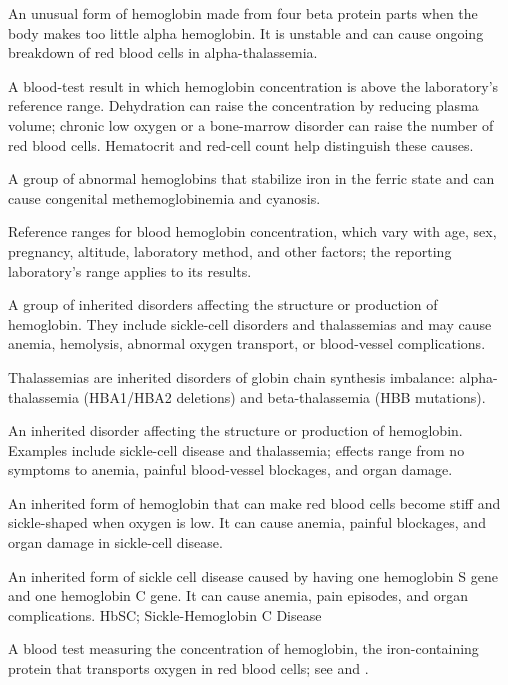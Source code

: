  An unusual form of hemoglobin made from four beta protein parts when the body makes too little alpha hemoglobin. It is unstable and can cause ongoing breakdown of red blood cells in alpha-thalassemia.

 A blood-test result in which hemoglobin concentration is above the laboratory's reference range. Dehydration can raise the concentration by reducing plasma volume; chronic low oxygen or a bone-marrow disorder can raise the number of red blood cells. Hematocrit and red-cell count help distinguish these causes.

 A group of abnormal hemoglobins that stabilize iron in the ferric state and can cause congenital methemoglobinemia and cyanosis.

 Reference ranges for blood hemoglobin concentration, which vary with age, sex, pregnancy, altitude, laboratory method, and other factors; the reporting laboratory's range applies to its results.

 A group of inherited disorders affecting the structure or production of hemoglobin. They include sickle-cell disorders and thalassemias and may cause anemia, hemolysis, abnormal oxygen transport, or blood-vessel complications.

 Thalassemias are inherited disorders of globin chain synthesis imbalance:
alpha-thalassemia (HBA1/HBA2 deletions) and beta-thalassemia (HBB mutations).

 An inherited disorder affecting the structure or production of hemoglobin. Examples include sickle-cell disease and thalassemia; effects range from no symptoms to anemia, painful blood-vessel blockages, and organ damage.

 An inherited form of hemoglobin that can make red blood cells become stiff and sickle-shaped when oxygen is low. It can cause anemia, painful blockages, and organ damage in sickle-cell disease.

 An inherited form of sickle cell disease caused by having one hemoglobin S gene and one hemoglobin C gene. It can cause anemia, pain episodes, and organ complications.
\synonyms
HbSC; Sickle-Hemoglobin C Disease

 A blood test measuring the concentration of hemoglobin, the iron-containing protein that transports oxygen in red blood cells; see  and .

